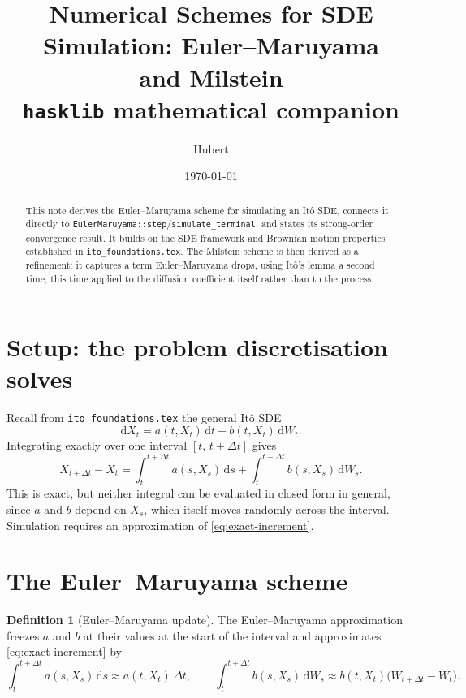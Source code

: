 \documentclass[11pt]{article}
\title{Numerical Schemes for SDE Simulation: Euler--Maruyama\\
       and Milstein\\
       \large \texttt{hasklib} mathematical companion}
\author{Hubert}
\date{\today}
\newcommand{\dd}{\mathrm{d}}
\newcommand{\dW}{\dd W_t}
\newcommand{\dt}{\dd t}
\newcommand{\drift}{a}
\newcommand{\diff}{b}
\theoremstyle{plain}
\theoremstyle{definition}
\newtheorem{definition}{Definition}
\theoremstyle{remark}
\begin{document}
\maketitle

\begin{abstract}
This note derives the Euler--Maruyama scheme for simulating an
It\^o SDE, connects it directly to
\texttt{EulerMaruyama::step}/\texttt{simulate\_terminal}, and states
its strong-order convergence result. It builds on the SDE framework
and Brownian motion properties established in
\texttt{ito\_foundations.tex}. The Milstein scheme is then derived as
a refinement: it captures a term Euler--Maruyama drops, using It\^o's
lemma a second time, this time applied to the diffusion coefficient
itself rather than to the process.
\end{abstract}

\section{Setup: the problem discretisation solves}

Recall from \texttt{ito\_foundations.tex} the general It\^o SDE
\[
   \dd X_t = \drift(t,X_t)\,\dt + \diff(t,X_t)\,\dW.
\]
Integrating exactly over one interval $[t,\,t+\Delta t]$ gives
\begin{equation}\label{eq:exact-increment}
   X_{t+\Delta t} - X_t
   = \int_t^{t+\Delta t} \drift(s,X_s)\,\dd s
   + \int_t^{t+\Delta t} \diff(s,X_s)\,\dd W_s.
\end{equation}
This is exact, but neither integral can be evaluated in closed form
in general, since $\drift$ and $\diff$ depend on $X_s$, which itself
moves randomly across the interval. Simulation requires an
approximation of \eqref{eq:exact-increment}.

\section{The Euler--Maruyama scheme}

\begin{definition}[Euler--Maruyama update]\label{def:em}
The Euler--Maruyama approximation freezes $\drift$ and $\diff$ at
their values at the start of the interval and approximates
\eqref{eq:exact-increment} by
\begin{equation}\label{eq:em-approx}
   \int_t^{t+\Delta t}\drift(s,X_s)\,\dd s \approx \drift(t,X_t)\,\Delta t,
   \qquad
   \int_t^{t+\Delta t}\diff(s,X_s)\,\dd W_s \approx \diff(t,X_t)\big(W_{t+\Delta t}-W_t\big).
\end{equation}
\end{definition}
\end{document}
